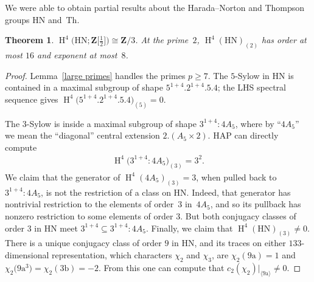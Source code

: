 \documentclass[pdftex]{sigma}
\numberwithin{equation}{section}
\newtheorem{Theorem}{Theorem}[section]
\newcommand\bZ{\mathbf Z}
\newcommand\ra{\mathrm a}
\newcommand\rb{\mathrm b}
\DeclareMathOperator\homology{H}
\renewcommand\H{\homology}
\newcommand\<\langle
\renewcommand\>\rangle
\begin{document}
We were able to obtain partial results about the Harada--Norton and Thompson groups $\mathrm{HN}$ and~$\mathrm{Th}$.

\begin{Theorem}
 $\H^4\big(\mathrm{HN}; \bZ\big[\frac12\big]\big) \cong \bZ/3$. At the prime~$2$, $\H^4(\mathrm{HN})_{(2)}$ has order at most $16$ and exponent at most~$8$.
\end{Theorem}


\begin{proof} Lemma~\ref{large primes} handles the primes $p\geq 7$. The $5$-Sylow in $\mathrm{HN}$ is contained in a maximal subgroup of shape $5^{1+4}.2^{1+4}.5.4$; the LHS spectral sequence gives $\H^4\big(5^{1+4}.2^{1+4}.5.4\big)_{(5)} = 0$.

 The $3$-Sylow is inside a maximal subgroup of shape $3^{1+4}:4A_5$, where by ``$4A_5$'' we mean the ``diagonal'' central extension $2.(A_5 \times 2)$. HAP can directly compute
 \begin{gather*} \H^4\big(3^{1+4}:4A_5\big)_{(3)} = 3^2.\end{gather*}
 We claim that the generator of $\H^4(4A_5)_{(3)} = 3$, when pulled back to $3^{1+4}:4A_5$, is not the restriction of a class on $\mathrm{HN}$. Indeed, that generator has nontrivial restriction to the elements of order~$3$ in~$4A_5$, and so its pullback has nonzero restriction to some elements of order $3$. But both conjugacy classes of order $3$ in $\mathrm{HN}$ meet $3^{1+4} \subseteq 3^{1+4}:4A_5$. Finally, we claim that $\H^4(\mathrm{HN})_{(3)} \neq 0$. There is a unique conjugacy class of order $9$ in $\mathrm{HN}$, and its traces on either $133$-dimensional representation, which characters $\chi_2$ and $\chi_3$, are $\chi_2(9\ra) = 1$ and $\chi_2\big(9\ra^3\big) = \chi_2(3\rb) = -2$. From this one can compute that $c_2(\chi_2)|_{\langle 9\ra\rangle} \neq 0$.


\end{proof}
\end{document}
